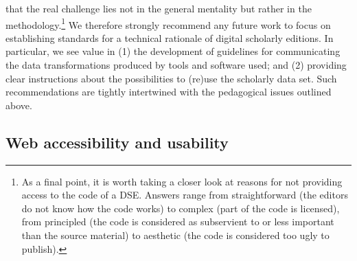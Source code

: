 \begin{paper}
that the real challenge lies not in the general mentality but rather in
the methodology.\footnote{As a final point, it is worth taking a closer
  look at reasons for not providing access to the code of a DSE. Answers
  range from straightforward (the editors do not know how the code
  works) to complex (part of the code is licensed), from principled (the
  code is considered as subservient to or less important than the source
  material) to aesthetic (the code is considered too ugly to publish).}
We therefore strongly recommend any future work to focus on establishing
standards for a technical rationale of digital scholarly editions. In
particular, we see value in (1) the development of guidelines for
communicating the data transformations produced by tools and software
used; and (2) providing clear instructions about the possibilities to
(re)use the scholarly data set. Such recommendations are tightly
intertwined with the pedagogical issues outlined above.

\subsection{Web accessibility and usability}


\end{paper}
